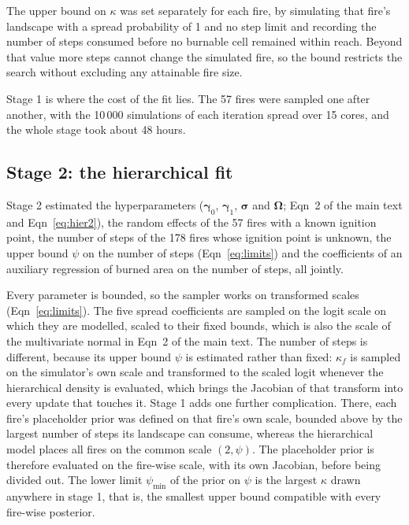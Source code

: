 \documentclass[11pt,a4paper]{article}
\begin{document}
The upper bound on $\kappa$ was set separately for each fire, by simulating that fire's
landscape with a spread probability of 1 and no step limit and recording the number of
steps consumed before no burnable cell remained within reach. Beyond that value more steps
cannot change the simulated fire, so the bound restricts the search without excluding any
attainable fire size.

Stage 1 is where the cost of the fit lies. The 57 fires were sampled one after another, with
the 10\,000 simulations of each iteration spread over 15 cores, and the whole stage took about
48 hours.

\subsection{Stage 2: the hierarchical fit}
\label{sec:stage2}

Stage 2 estimated the hyperparameters ($\boldsymbol{\gamma}_0$, $\boldsymbol{\gamma}_1$,
$\boldsymbol{\sigma}$ and $\boldsymbol{\Omega}$; Eqn~2 of the main text and
Eqn~\ref{eq:hier2}), the random effects of the 57 fires with a known ignition point, the
number of steps of the 178 fires whose ignition point is unknown, the upper bound $\psi$ on the number of
steps (Eqn~\ref{eq:limits}) and the coefficients of an auxiliary regression of burned area on the
number of steps, all jointly.

Every parameter is bounded, so the sampler works on transformed scales
(Eqn~\ref{eq:limits}). The five spread coefficients are sampled on the logit scale on
which they are modelled, scaled to their fixed bounds, which is also the scale of the
multivariate normal in Eqn~2 of the main text. The number of steps is different, because its upper bound $\psi$
is estimated rather than fixed: $\kappa_f$ is sampled on the simulator's own scale and
transformed to the scaled logit whenever the hierarchical density is evaluated, which
brings the Jacobian of that transform into every update that touches it. Stage 1 adds one
further complication. There, each fire's placeholder prior was defined on that fire's own
scale, bounded above by the largest number of steps its landscape can consume, whereas the
hierarchical model places all fires on the common scale $(2, \psi)$. The placeholder prior
is therefore evaluated on the fire-wise scale, with its own Jacobian, before being divided
out. The lower limit $\psi_{\min}$ of the prior on $\psi$ is the largest $\kappa$ drawn
anywhere in stage 1, that is, the smallest upper bound compatible with every fire-wise
posterior.
\end{document}
